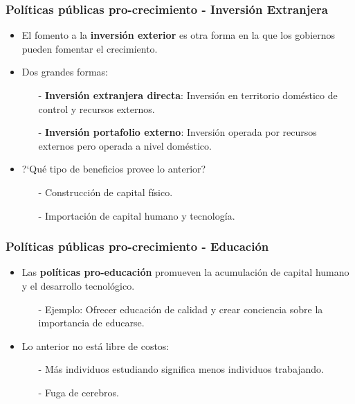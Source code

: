 \documentclass{beamer}
\begin{document}
\begin{frame}
\frametitle{Pol\'iticas p\'ublicas pro-crecimiento - Inversi\'on Extranjera}
\begin{itemize}
\setlength\itemsep{1.0em}
\item El fomento a la \textbf{inversi\'on exterior} es otra forma en la que los gobiernos pueden fomentar el crecimiento.
\item Dos grandes formas:\\
\begin{itemize}
\setlength\itemsep{0.8em}
\item[-] \textbf{Inversi\'on extranjera directa}: Inversi\'on en territorio dom\'estico de control y recursos externos.
\item[-] \textbf{Inversi\'on portafolio externo}: Inversi\'on operada por recursos externos pero operada a nivel dom\'estico.
\end{itemize}
\item ?`Qu\'e tipo de beneficios provee lo anterior?\\
\begin{itemize}
\setlength\itemsep{0.7em}
\item[-] Construcci\'on de capital f\'isico.
\item[-] Importaci\'on de capital humano y tecnolog\'ia.
\end{itemize}
\end{itemize}
\end{frame}

\begin{frame}
\frametitle{Pol\'iticas p\'ublicas pro-crecimiento - Educaci\'on}
\begin{itemize}
\setlength\itemsep{1.4em}
\item Las \textbf{pol\'iticas pro-educaci\'on} promueven la acumulaci\'on de capital humano y el desarrollo tecnol\'ogico.\\
\begin{itemize}
\item[-] Ejemplo: Ofrecer educaci\'on de calidad y crear conciencia sobre la importancia de educarse.
\end{itemize}
\item Lo anterior no est\'a libre de costos:\\
\begin{itemize}
\setlength\itemsep{0.7em}
\item[-] M\'as individuos estudiando significa menos individuos trabajando.
\item[-] Fuga de cerebros.
\end{itemize}
\end{itemize}
\end{frame}
\end{document}
